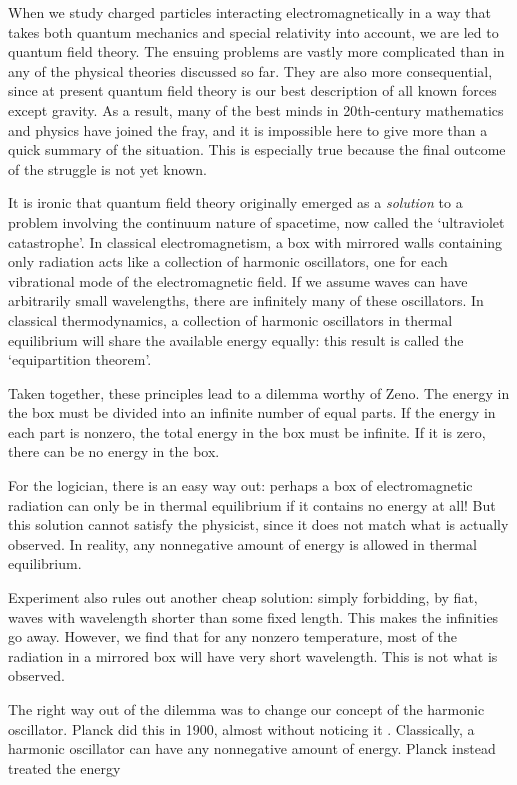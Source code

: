 \documentclass{article}
\begin{document}
When we study charged particles interacting electromagnetically in a way that
takes both quantum mechanics and special relativity into account, we are led to
quantum field theory.  The ensuing problems are vastly more complicated than in any of the physical theories discussed so far.  They are also more consequential, since at present quantum field theory is our best description of all known forces except gravity.  As a result, many of the best minds in 20th-century mathematics and physics have joined the fray, and it is impossible here to give more than a quick summary of the situation. This is especially true because the final outcome of the struggle is not yet known.

It is ironic that quantum field theory originally emerged as a \emph{solution} to a problem involving the continuum nature of spacetime, now called the `ultraviolet catastrophe'.  In classical electromagnetism, a box with mirrored walls containing only radiation acts like a collection of harmonic oscillators, one for each vibrational mode of the electromagnetic field.  If we assume waves can have arbitrarily small wavelengths, there are infinitely many of these oscillators.  In classical thermodynamics, a collection of harmonic oscillators in thermal equilibrium will share the available energy equally: this result is called the `equipartition theorem'.  

Taken together, these principles lead to a dilemma worthy of Zeno.  The energy in the box must be divided into an infinite number of equal parts.  If the energy in each part is nonzero, the total energy in the box must be infinite.  If it is zero, there can be no energy in the box.  

For the logician, there is an easy way out: perhaps a box of electromagnetic radiation can only be in thermal equilibrium if it contains no energy at all!   But this solution cannot satisfy the physicist, since it does not match what is actually observed.  In reality, any nonnegative amount of energy is allowed in thermal equilibrium.  

Experiment also rules out another cheap solution: simply forbidding, by fiat, waves with wavelength shorter than some fixed length.  This makes the infinities go away.  However, we find that for any nonzero temperature, most of the radiation in a mirrored box will have very short wavelength.  This is not what is observed.

The right way out of the dilemma was to change our concept of the harmonic oscillator.  Planck did this in 1900, almost without noticing it \cite{Planck}.  Classically, a harmonic oscillator can have any nonnegative amount of energy.  Planck instead treated the energy 
\end{document}
